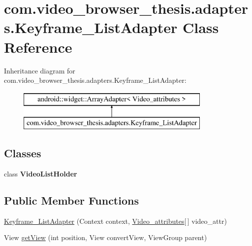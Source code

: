 \hypertarget{classcom_1_1video__browser__thesis_1_1adapters_1_1_keyframe___list_adapter}{\section{com.\-video\-\_\-browser\-\_\-thesis.\-adapters.\-Keyframe\-\_\-\-List\-Adapter Class Reference}
\label{classcom_1_1video__browser__thesis_1_1adapters_1_1_keyframe___list_adapter}
}
Inheritance diagram for com.\-video\-\_\-browser\-\_\-thesis.\-adapters.\-Keyframe\-\_\-\-List\-Adapter\-:\begin{figure}[H]
\begin{center}
\leavevmode
\includegraphics[height=2.000000cm]{classcom_1_1video__browser__thesis_1_1adapters_1_1_keyframe___list_adapter}
\end{center}
\end{figure}
\subsection*{Classes}
\begin{DoxyCompactItemize}
\item 
class {\bfseries Video\-List\-Holder}
\end{DoxyCompactItemize}
\subsection*{Public Member Functions}
\begin{DoxyCompactItemize}
\item 
\hyperlink{classcom_1_1video__browser__thesis_1_1adapters_1_1_keyframe___list_adapter_a8f7397a9bc9a4c41413f68d063ada0d4}{Keyframe\-\_\-\-List\-Adapter} (Context context, \hyperlink{classcom_1_1video__browser__thesis_1_1elements_1_1_video__attributes}{Video\-\_\-attributes}\mbox{[}$\,$\mbox{]} video\-\_\-attr)
\item 
View \hyperlink{classcom_1_1video__browser__thesis_1_1adapters_1_1_keyframe___list_adapter_add720f1361a5d6554fe51b188bbd7c1c}{get\-View} (int position, View convert\-View, View\-Group parent)
\end{DoxyCompactItemize}


